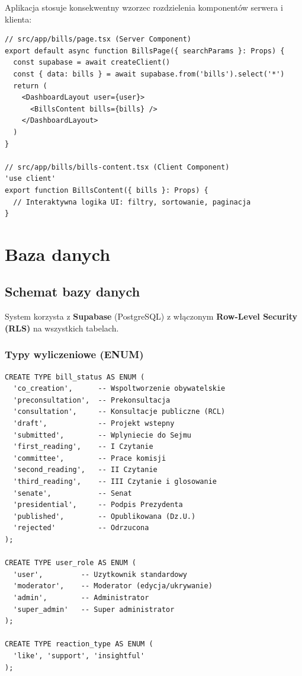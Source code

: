 \documentclass[12pt,a4paper]{article}
\begin{document}
Aplikacja stosuje konsekwentny wzorzec rozdzielenia komponentów serwera i klienta:

\begin{lstlisting}[style=typescript, title=Wzorzec Server Component + Client Content]
// src/app/bills/page.tsx (Server Component)
export default async function BillsPage({ searchParams }: Props) {
  const supabase = await createClient()
  const { data: bills } = await supabase.from('bills').select('*')
  return (
    <DashboardLayout user={user}>
      <BillsContent bills={bills} />
    </DashboardLayout>
  )
}

// src/app/bills/bills-content.tsx (Client Component)
'use client'
export function BillsContent({ bills }: Props) {
  // Interaktywna logika UI: filtry, sortowanie, paginacja
}
\end{lstlisting}

\newpage

\section{Baza danych}

\subsection{Schemat bazy danych}

System korzysta z \textbf{Supabase} (PostgreSQL) z włączonym \textbf{Row-Level Security (RLS)} na wszystkich tabelach.

\subsubsection{Typy wyliczeniowe (ENUM)}

\begin{lstlisting}[style=sql, title=Typy ENUM w PostgreSQL]
CREATE TYPE bill_status AS ENUM (
  'co_creation',      -- Wspoltworzenie obywatelskie
  'preconsultation',  -- Prekonsultacja
  'consultation',     -- Konsultacje publiczne (RCL)
  'draft',            -- Projekt wstepny
  'submitted',        -- Wplyniecie do Sejmu
  'first_reading',    -- I Czytanie
  'committee',        -- Prace komisji
  'second_reading',   -- II Czytanie
  'third_reading',    -- III Czytanie i glosowanie
  'senate',           -- Senat
  'presidential',     -- Podpis Prezydenta
  'published',        -- Opublikowana (Dz.U.)
  'rejected'          -- Odrzucona
);

CREATE TYPE user_role AS ENUM (
  'user',         -- Uzytkownik standardowy
  'moderator',    -- Moderator (edycja/ukrywanie)
  'admin',        -- Administrator
  'super_admin'   -- Super administrator
);

CREATE TYPE reaction_type AS ENUM (
  'like', 'support', 'insightful'
);
\end{lstlisting}
\end{document}
